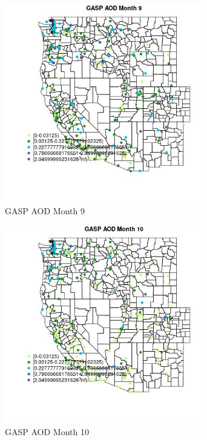 \begin{figure} 
\centering  
\includegraphics[width=0.77\textwidth]{Code_Outputs/Report_ML_input_PM25_Step4_part_e_de_duplicated_aveswNAs_MapObsMo9GASP_AOD.jpg} 
\caption{\label{fig:Report_ML_input_PM25_Step4_part_e_de_duplicated_aveswNAsMapObsMo9GASP_AOD}GASP AOD Month 9} 
\end{figure} 
 

\begin{figure} 
\centering  
\includegraphics[width=0.77\textwidth]{Code_Outputs/Report_ML_input_PM25_Step4_part_e_de_duplicated_aveswNAs_MapObsMo10GASP_AOD.jpg} 
\caption{\label{fig:Report_ML_input_PM25_Step4_part_e_de_duplicated_aveswNAsMapObsMo10GASP_AOD}GASP AOD Month 10} 
\end{figure} 
 

